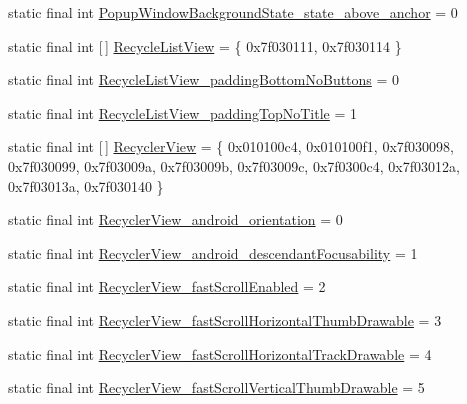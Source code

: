 \begin{DoxyCompactItemize}
\item 
static final int \mbox{\hyperlink{classandroid_1_1support_1_1design_1_1R_1_1styleable_a9653139b89d50df3ffe6fe98aef4c6c2}{Popup\+Window\+Background\+State\+\_\+state\+\_\+above\+\_\+anchor}} = 0
\item 
static final int \mbox{[}$\,$\mbox{]} \mbox{\hyperlink{classandroid_1_1support_1_1design_1_1R_1_1styleable_a3c29f583649e45ac1f85ab5775cd480d}{Recycle\+List\+View}} = \{ 0x7f030111, 0x7f030114 \}
\item 
static final int \mbox{\hyperlink{classandroid_1_1support_1_1design_1_1R_1_1styleable_aa4906eeb497fcc32fc46af5a93850ea6}{Recycle\+List\+View\+\_\+padding\+Bottom\+No\+Buttons}} = 0
\item 
static final int \mbox{\hyperlink{classandroid_1_1support_1_1design_1_1R_1_1styleable_a2a7057fc4a02aacc39f806ea8844e76a}{Recycle\+List\+View\+\_\+padding\+Top\+No\+Title}} = 1
\item 
static final int \mbox{[}$\,$\mbox{]} \mbox{\hyperlink{classandroid_1_1support_1_1design_1_1R_1_1styleable_a1700d79470c52662f934bd53b1a05a14}{Recycler\+View}} = \{ 0x010100c4, 0x010100f1, 0x7f030098, 0x7f030099, 0x7f03009a, 0x7f03009b, 0x7f03009c, 0x7f0300c4, 0x7f03012a, 0x7f03013a, 0x7f030140 \}
\item 
static final int \mbox{\hyperlink{classandroid_1_1support_1_1design_1_1R_1_1styleable_ab9390b378dd6563d22143690901058f6}{Recycler\+View\+\_\+android\+\_\+orientation}} = 0
\item 
static final int \mbox{\hyperlink{classandroid_1_1support_1_1design_1_1R_1_1styleable_a448c8a9d6df9b29107ef83d38ea7b81b}{Recycler\+View\+\_\+android\+\_\+descendant\+Focusability}} = 1
\item 
static final int \mbox{\hyperlink{classandroid_1_1support_1_1design_1_1R_1_1styleable_acd05409ffd4040301dbbc135f7d68ca7}{Recycler\+View\+\_\+fast\+Scroll\+Enabled}} = 2
\item 
static final int \mbox{\hyperlink{classandroid_1_1support_1_1design_1_1R_1_1styleable_a428b728acd01942475bedd6c720b7074}{Recycler\+View\+\_\+fast\+Scroll\+Horizontal\+Thumb\+Drawable}} = 3
\item 
static final int \mbox{\hyperlink{classandroid_1_1support_1_1design_1_1R_1_1styleable_a07b39048d492e02cb1c131ece9143f57}{Recycler\+View\+\_\+fast\+Scroll\+Horizontal\+Track\+Drawable}} = 4
\item 
static final int \mbox{\hyperlink{classandroid_1_1support_1_1design_1_1R_1_1styleable_af8b09c77a7b099e58b5fee50f2646753}{Recycler\+View\+\_\+fast\+Scroll\+Vertical\+Thumb\+Drawable}} = 5

\end{DoxyCompactItemize}

